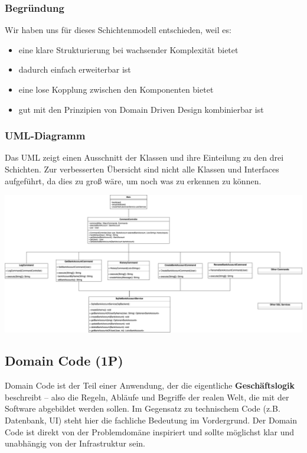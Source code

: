 \subsubsection*{Begründung}
Wir haben uns für dieses Schichtenmodell entschieden, weil es:
\begin{itemize}
    \item eine klare Strukturierung bei wachsender Komplexität bietet
    \item dadurch einfach erweiterbar ist
    \item eine lose Kopplung zwischen den Komponenten bietet
    \item gut mit den Prinzipien von Domain Driven Design kombinierbar ist
\end{itemize}

\subsubsection*{UML-Diagramm}

Das UML zeigt einen Ausschnitt der Klassen und ihre Einteilung zu den drei Schichten.
Zur verbesserten Übersicht sind nicht alle Klassen und Interfaces aufgeführt, da dies zu groß wäre, um noch was zu erkennen zu können.

\includegraphics[width=\linewidth]{kapitel2_architektur/Softwarearchitekturen.drawio.png}



\subsection{Domain Code (1P)}
Domain Code ist der Teil einer Anwendung, der die eigentliche \textbf{Geschäftslogik} beschreibt – also die Regeln, Abläufe und Begriffe der realen Welt, die mit der Software abgebildet werden sollen. Im Gegensatz zu technischem Code (z.B. Datenbank, UI) steht hier die fachliche Bedeutung im Vordergrund. Der Domain Code ist direkt von der Problemdomäne inspiriert und sollte möglichst klar und unabhängig von der Infrastruktur sein.

